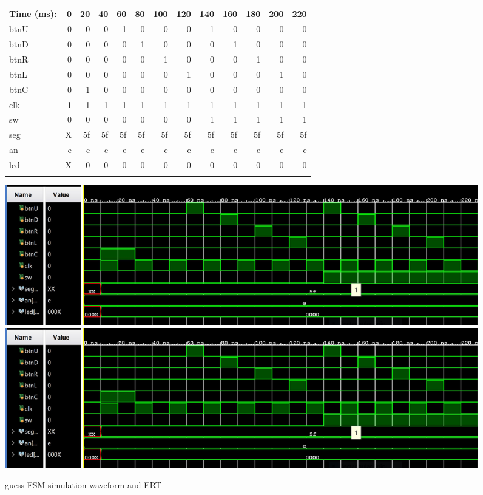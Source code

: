 \documentclass[11pt]{article}
\begin{document}
\begin{figure}[ht]\centering
	\begin{tabular}{l|rrrrrrrrrrrr}
		Time (ms): & 0 & 20 & 40 & 60 & 80  & 100 & 120 & 140 & 160 & 180 & 200 & 220 \\
		\midrule
		btnU & 0 & 0 & 0 & 1 & 0 & 0 & 0 & 1 & 0 & 0 & 0 & 0  \\
		btnD & 0 & 0 & 0 & 0 & 1 & 0 & 0 & 0 & 1 & 0 & 0 & 0  \\
		btnR & 0 & 0 & 0 & 0 & 0 & 1 & 0 & 0 & 0 & 1 & 0 & 0  \\
		btnL & 0 & 0 & 0 & 0 & 0 & 0 & 1 & 0 & 0 & 0 & 1 & 0  \\
		btnC & 0 & 1 & 0 & 0 & 0 & 0 & 0 & 0 & 0 & 0 & 0 & 0  \\
		clk & 1 & 1 & 1 & 1 & 1 & 1 & 1 & 1 & 1 & 1 & 1 & 1  \\
		sw & 0 & 0 & 0 & 0 & 0 & 0 & 0 & 1 & 1 & 1 & 1 & 1  \\
		\midrule
		seg & X & 5f & 5f & 5f & 5f & 5f & 5f & 5f & 5f & 5f & 5f & 5f  \\
		an & e & e & e & e & e & e & e & e & e & e & e & e  \\
		led & X & 0 & 0 & 0 & 0 & 0 & 0 & 0 & 0 & 0 & 0 & 0  \\
		\midule
	
		\midrule
		
		\bottomrule
	\end{tabular}\medskip
	
	\includegraphics[trim=0cm 0cm 9cm 0cm,clip]{guessing_game_test.JPG}
	\includegraphics[trim=14.5cm 0cm 0cm 0cm,clip]{guessing_game_test.JPG}
	
	\caption{guess FSM simulation waveform and ERT}
	\label{fig:sim_with_table}
\end{figure}
\end{document}
